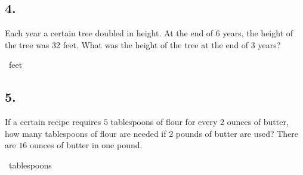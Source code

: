 \documentclass[12pt]{article}
\newenvironment{answer}{\vspace{1em}}{}
\newenvironment{answer}{\vspace{0em}\expandafter\comment}{\expandafter\endcomment}
\newlength{\currentparskip}
\newlength{\currentparindent}
\newenvironment{minipagex}[2][]
  {\setlength{\currentparskip}{\parskip}%
    \setlength{\currentparindent}{\parindent}%
   \begin{minipage}[#1]{#2}%
   \setlength{\parskip}{\currentparskip}%
   \setlength{\parindent}{\currentparindent}%
  }
  {\end{minipage}}
\begin{document}
\subsection*{4.}
Each year a certain tree doubled in height. At the end of $6$ years, the height of the tree was 32 feet. What was the height of the tree at the end of $3$ years?

\fbox{\phantom{ANSWER}}~feet

\begin{answer}
%
\end{answer}



\subsection*{5.}
If a certain recipe requires $5$ tablespoons of flour for every $2$ ounces of butter, how many tablespoons of flour are needed if $2$ pounds of butter are used? There are $16$ ounces of butter in one pound. 

\fbox{\phantom{ANSWER}}~tablespoons
\end{document}
